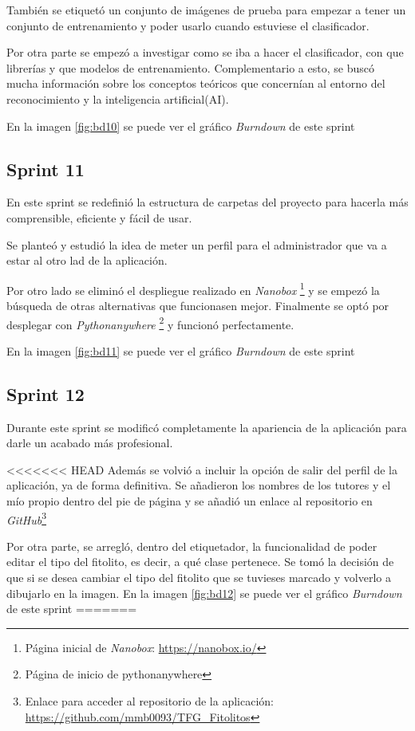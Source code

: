 También se etiquetó un conjunto de imágenes de prueba para empezar a tener un conjunto de entrenamiento y poder usarlo cuando estuviese el clasificador.

Por otra parte se empezó a investigar como se iba a hacer el clasificador, con que librerías y que modelos de entrenamiento. Complementario a esto, se buscó mucha información sobre los conceptos teóricos que concernían al entorno del reconocimiento y la inteligencia artificial(AI).

En la imagen \ref{fig:bd10} se puede ver el gráfico \textit{Burndown} de este sprint
\subsection{Sprint 11}

En este sprint se redefinió la estructura de carpetas del proyecto para hacerla más comprensible, eficiente y fácil de usar.

Se planteó y estudió la idea de meter un perfil para el administrador que va a estar al otro lad de la aplicación.

Por otro lado se eliminó el despliegue realizado en \textit{Nanobox} \footnote{Página inicial de \textit{Nanobox}: \url{https://nanobox.io/} } y se empezó la búsqueda de otras alternativas que funcionasen mejor.
Finalmente se optó por desplegar con \textit{Pythonanywhere} \footnote{Página de inicio de pythonanywhere} y funcionó perfectamente.

En la imagen \ref{fig:bd11} se puede ver el gráfico \textit{Burndown} de este sprint
\subsection{Sprint 12}

Durante este sprint se modificó completamente la apariencia de la aplicación para darle un acabado más profesional.

<<<<<<< HEAD
Además se volvió a incluir la opción de salir del perfil de la aplicación, ya de forma definitiva.
Se añadieron los nombres de los tutores y el mío propio dentro del pie de página y se añadió un enlace al repositorio en \textit{GitHub}\footnote{Enlace para acceder al repositorio de la aplicación: \url{https://github.com/mmb0093/TFG_Fitolitos}}

Por otra parte, se arregló, dentro del etiquetador, la funcionalidad de poder editar el tipo del fitolito, es decir, a qué clase pertenece. Se tomó la decisión de que si se desea cambiar el tipo del fitolito que se tuvieses marcado y  volverlo a dibujarlo en la imagen.
En la imagen \ref{fig:bd12} se puede ver el gráfico \textit{Burndown} de este sprint
=======

